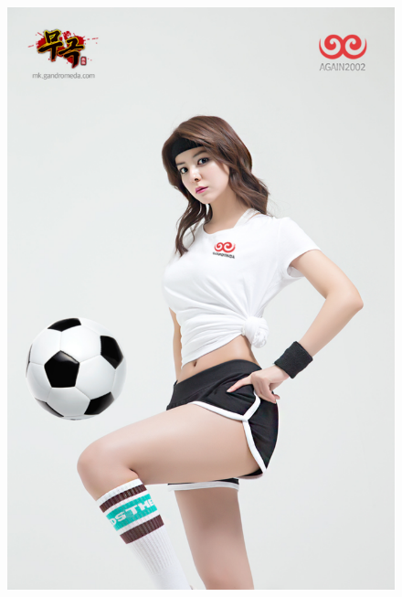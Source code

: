 			\clearpage
			\begin{figure}
			\centering
			\includegraphics[height=1\paperheight]{./fig/8.pdf}
			\end{figure}
			\clearpage
		
